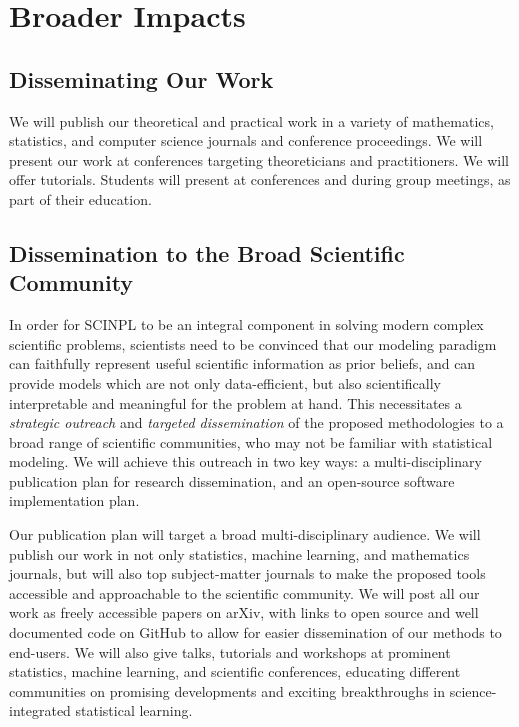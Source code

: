 \documentclass[11pt]{NSFamsart}
\newcommand{\cmtS}[1]{{\color{blue}{(Simon: #1)}}}
\begin{document}
\section{Broader Impacts}


\subsection{Disseminating Our Work} We will publish our theoretical and practical work in a variety of mathematics, statistics, and computer science journals and conference proceedings. We will present our work at conferences targeting theoreticians and practitioners.  We will offer tutorials.  Students will present at conferences and during group meetings, as part of their education. \cmtS{expand and discuss cross-disciplinary dissemination to the broad scientific community? some sample writing below from another proposal}

\subsection*{Dissemination to the Broad Scientific Community}
In order for SCINPL to be an integral component in solving modern complex scientific problems, scientists need to be convinced that our modeling paradigm can faithfully represent useful scientific information as prior beliefs, and can provide models which are not only data-efficient, but also scientifically interpretable and meaningful for the problem at hand. This necessitates a \textit{strategic outreach} and \textit{targeted dissemination} of the proposed methodologies to a broad range of scientific communities, who may not be familiar with statistical modeling. We will achieve this outreach in two key ways: a multi-disciplinary publication plan for research dissemination, and an open-source software implementation plan. 

Our publication plan will target a broad multi-disciplinary audience. We will publish our work in not only statistics, machine learning, and mathematics journals, but will also top subject-matter journals to make the proposed tools accessible and approachable to the scientific community. We will post all our work as freely accessible papers on arXiv, with links to open source and well documented code on GitHub to allow for easier dissemination of our methods to end-users. We will also give talks, tutorials and workshops at prominent statistics, machine learning, and scientific conferences, educating different communities on promising developments and exciting breakthroughs in science-integrated statistical learning.
\end{document}
